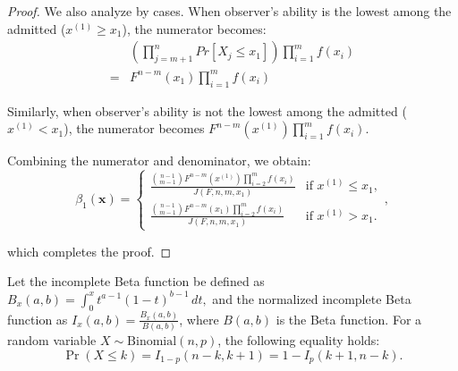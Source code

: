 \begin{proof}
We also analyze by cases. When observer's ability is the lowest among the admitted (\(x^{(1)} \geq x_1\)), the numerator becomes: 
\[
    \begin{aligned}
        & \left ( \prod_{j=m+1}^{n} Pr\left [ X_j \leq x_1 \right ] \right ) \prod_{i=1}^mf(x_i) \\
        = & F^{n-m}(x_1)\prod_{i=1}^mf(x_i)  
    \end{aligned}
\]

Similarly, when observer's ability is not the lowest among the admitted (\(x^{(1)} < x_1\)), the numerator becomes $F^{n-m}(x^{(1)})\prod_{i=1}^mf(x_i)$. 

Combining the numerator and denominator, we obtain:
\[
    \beta_1(\mathbf{x}) =   
    \begin{cases} 
    \frac{\binom{n-1}{m-1}F^{n-m}(x^{(1)})\prod_{i=2}^{m}f(x_i)}{J(F,n,m,x_1)} & \text{if } x^{(1)} \leq x_1, \\
    \frac{\binom{n-1}{m-1}F^{n-m}(x_1)\prod_{i=2}^{m}f(x_i)}{J(F,n,m,x_1)} & \text{if } x^{(1)} > x_1.
    \end{cases},
\]

which completes the proof.
\end{proof}

\begin{lemma} \label{lem:betaRep}
Let the incomplete Beta function be defined as 
\(
B_x(a, b) = \int_{0}^{x} t^{a-1}(1-t)^{b-1} \, dt,
\)
and the normalized incomplete Beta function as 
\(
I_x(a, b) = \frac{B_x(a, b)}{B(a, b)}
\),
where \(B(a, b)\) is the Beta function. For a random variable \(X \sim \text{Binomial}(n, p)\), the following equality holds:
\[
\Pr(X \leq k) = I_{1-p}(n-k, k+1) = 1 - I_p(k+1, n-k).
\]
\end{lemma}

